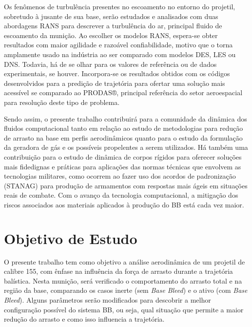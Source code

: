 Os fenômenos de turbulência presentes no escoamento no entorno do projetil, sobretudo à jusante de sua base, serão estudados e analisados com duas abordagens RANS para descrever a turbulência do ar, principal fluido de escoamento da munição. Ao escolher os modelos RANS, espera-se obter resultados com maior agilidade e razoável confiabilidade, motivo que o torna amplamente usado na indústria ao ser comparado com modelos DES, LES ou DNS. Todavia, há de se olhar para os valores de referência ou de dados experimentais, se houver. Incorpora-se os resultados obtidos com os códigos desenvolvidos para a predição de trajetória para ofertar uma solução mais acessível se comparado ao PRODAS®, principal referência do setor aeroespacial para resolução deste tipo de problema.

Sendo assim, o presente trabalho contribuirá para a comunidade da dinâmica dos fluidos computacional tanto em relação ao estudo de metodologias para redução de arrasto na base em perfis aerodinâmicos quanto para o estudo da formulação da geradora de gás e os possíveis propelentes a serem utilizados. Há também uma contribuição para o estudo de dinâmica de corpos rígidos para oferecer soluções mais fidedignas e práticas para aplicações das normas técnicas que envolvem as tecnologias militares, como ocorrem ao fazer uso dos acordos de padronização (STANAG) para produção de armamentos com respostas mais ágeis em situações reais de combate. Com o avanço da tecnologia computacional, a mitigação dos riscos associados aos materiais aplicados à produção do BB está cada vez maior. 

\section{Objetivo de Estudo}

O presente trabalho tem como objetivo a análise aerodinâmica de um projetil de calibre \qty{155}{\millimetre}, com ênfase na influência da força de arrasto durante a trajetória balística. Nesta munição, será verificado o comportamento do arrasto total e na região da base, comparando os casos inerte (sem \textit{Base Bleed}) e o ativo (com \textit{Base Bleed}). Alguns parâmetros serão modificados para descobrir a melhor configuração possível do sistema BB, ou seja, qual situação que permite a maior redução do arrasto e como isso influencia a trajetória.
	
